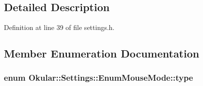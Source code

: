\subsection{Detailed Description}


Definition at line 39 of file settings.\+h.



\subsection{Member Enumeration Documentation}
\hypertarget{classOkular_1_1Settings_1_1EnumMouseMode_ab2ae04e2d7d069f02195ccf32c52415b}{
\subsubsection[{type}]{\setlength{\rightskip}{0pt plus 5cm}enum {\bf Okular\+::\+Settings\+::\+Enum\+Mouse\+Mode\+::type}}}\label{classOkular_1_1Settings_1_1EnumMouseMode_ab2ae04e2d7d069f02195ccf32c52415b}
